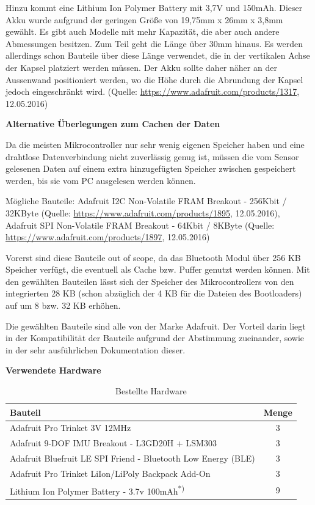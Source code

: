 Hinzu kommt eine Lithium Ion Polymer Battery mit 3,7V und 150mAh. Dieser Akku wurde aufgrund der geringen Größe von 19,75mm x 26mm x 3,8mm gewählt. Es gibt auch Modelle mit mehr Kapazität, die aber auch andere Abmessungen besitzen. Zum Teil geht die Länge über 30mm hinaus. Es werden allerdings schon Bauteile über diese Länge verwendet, die in der vertikalen Achse der Kapsel platziert werden müssen. Der Akku sollte daher näher an der Aussenwand positioniert werden, wo die Höhe durch die Abrundung der Kapsel jedoch eingeschränkt wird. (Quelle: \url{https://www.adafruit.com/products/1317}, 12.05.2016)

\textbf{Alternative Überlegungen zum Cachen der Daten}

Da die meisten Mikrocontroller nur sehr wenig eigenen Speicher haben und eine drahtlose Datenverbindung nicht zuverlässig genug ist, müssen die vom Sensor gelesenen Daten auf einem extra hinzugefügten Speicher zwischen gespeichert werden, bis sie vom PC ausgelesen werden können.

Mögliche Bauteile: Adafruit I2C Non-Volatile FRAM Breakout - 256Kbit / 32KByte (Quelle: \url{https://www.adafruit.com/products/1895}, 12.05.2016), Adafruit SPI Non-Volatile FRAM Breakout - 64Kbit / 8KByte (Quelle: \url{https://www.adafruit.com/products/1897}, 12.05.2016) 

Vorerst sind diese Bauteile out of scope, da das Bluetooth Modul über 256 KB Speicher verfügt, die eventuell als Cache bzw. Puffer genutzt werden können.
Mit den gewählten Bauteilen lässt sich der Speicher des Mikrocontrollers von den integrierten 28 KB (schon abzüglich der 4 KB für die Dateien des Bootloaders) auf um 8 bzw. 32  KB erhöhen. 

Die gewählten Bauteile sind alle von der Marke Adafruit. Der Vorteil darin liegt in der Kompatibilität der Bauteile aufgrund der Abstimmung zueinander, sowie in der sehr ausführlichen Dokumentation dieser. 

\textbf{Verwendete Hardware}

\begin{table}[h]
	\centering
	\begin{tabular}{|l|c|}
		\hline
		\textbf{Bauteil} & \textbf{Menge} \\
		\hline
		 Adafruit Pro Trinket 3V 12MHz & 3 \\
		 \hline
		 Adafruit 9-DOF IMU Breakout - L3GD20H + LSM303 & 3 \\
		 \hline
		 Adafruit Bluefruit LE SPI Friend - Bluetooth Low Energy (BLE) & 3 \\
		 \hline
		 Adafruit Pro Trinket LiIon/LiPoly Backpack Add-On & 3 \\
		 \hline
		 Lithium Ion Polymer Battery - 3.7v 100mAh\textsuperscript{*)} & 9 \\
		 \hline		 
	\end{tabular}
		\caption{Bestellte Hardware}
		\label{tab:bestellteHW}
\end{table}

